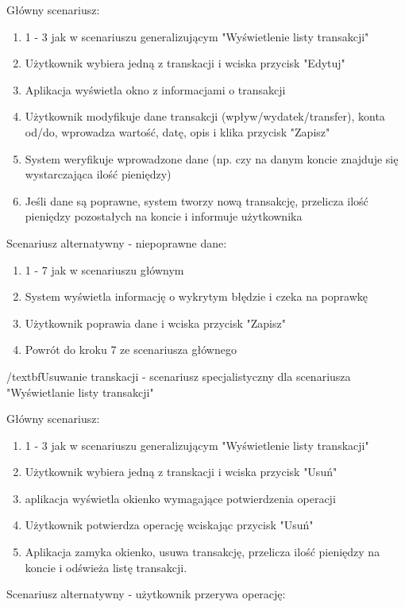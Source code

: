 Główny scenariusz:
\begin{enumerate}
  \item 1 - 3 jak w scenariuszu generalizującym "Wyświetlenie listy transakcji"
  \item Użytkownik wybiera jedną z transkacji i wciska przycisk "Edytuj"
  \item Aplikacja wyświetla okno z informacjami o transakcji
  \item Użytkownik modyfikuje dane transakcji (wpływ/wydatek/transfer), konta od/do, wprowadza wartość, datę, opis i klika przycisk "Zapisz"
  \item System weryfikuje wprowadzone dane (np. czy na danym koncie znajduje się wystarczająca ilość pieniędzy)
  \item Jeśli dane są poprawne, system tworzy nową transakcję, przelicza ilość pieniędzy pozostałych na koncie i informuje użytkownika
\end{enumerate}

Scenariusz alternatywny - niepoprawne dane:
\begin{enumerate}
  \item 1 - 7 jak w scenariuszu głównym
  \item System wyświetla informację o wykrytym błędzie i czeka na poprawkę
  \item Użytkownik poprawia dane i wciska przycisk "Zapisz"
  \item Powrót do kroku 7 ze scenariusza głównego
\end{enumerate}

/textbf{Usuwanie transkacji - scenariusz specjalistyczny dla scenariusza "Wyświetlanie listy transakcji"}

Główny scenariusz:

\begin{enumerate}
  \item 1 - 3 jak w scenariuszu generalizującym "Wyświetlenie listy transkacji"
  \item Użytkownik wybiera jedną z transkacji i wciska przycisk "Usuń"
  \item aplikacja wyświetla okienko wymagające potwierdzenia operacji
  \item Użytkownik potwierdza operację wciskając przycisk "Usuń"
  \item Aplikacja zamyka okienko, usuwa transakcję, przelicza ilość pieniędzy na koncie i odświeża listę transakcji.
\end{enumerate}

Scenariusz alternatywny - użytkownik przerywa operację:

